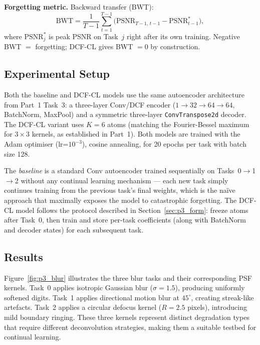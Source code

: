 \documentclass[11pt,letterpaper]{article}
\begin{document}
\textbf{Forgetting metric.}  Backward transfer (BWT):
\begin{equation}
  \mathrm{BWT} = \frac{1}{T{-}1}\sum_{t=1}^{T-1}
  \bigl(\mathrm{PSNR}_{T-1,\,t-1} - \mathrm{PSNR}^*_{t-1}\bigr),
\end{equation}
where $\mathrm{PSNR}^*_j$ is peak PSNR on Task~$j$ right after its own
training.  Negative BWT $=$ forgetting; DCF-CL gives BWT $= 0$ by construction.

\subsection{Experimental Setup}
\label{sec:p3_setup}

Both the baseline and DCF-CL models use the same autoencoder architecture
from Part~1 Task~3: a three-layer Conv/DCF encoder
($1\to32\to64\to64$, BatchNorm, MaxPool) and a symmetric three-layer
\texttt{ConvTranspose2d} decoder.  The DCF-CL variant uses $K=6$ atoms
(matching the Fourier-Bessel maximum for $3{\times}3$ kernels, as
established in Part~1).  Both models are trained with the Adam optimiser
(lr=$10^{-3}$), cosine annealing, for 20 epochs per task with batch size
128.

The \emph{baseline} is a standard Conv autoencoder trained sequentially
on Tasks~0$\to$1$\to$2 without any continual learning mechanism --- each
new task simply continues training from the previous task's final weights,
which is the na\"{i}ve approach that maximally exposes the model to
catastrophic forgetting.  The DCF-CL model follows the protocol described
in Section~\ref{sec:p3_form}: freeze atoms after Task~0, then train and
store per-task coefficients (along with BatchNorm and decoder states) for
each subsequent task.

\subsection{Results}
\label{sec:p3_results}

Figure~\ref{fig:p3_blur} illustrates the three blur tasks and their
corresponding PSF kernels.  Task~0 applies isotropic Gaussian blur
($\sigma=1.5$), producing uniformly softened digits.  Task~1 applies
directional motion blur at $45^\circ$, creating streak-like artefacts.
Task~2 applies a circular defocus kernel ($R=2.5$ pixels), introducing
mild boundary ringing.  These three kernels represent distinct degradation
types that require different deconvolution strategies, making them a
suitable testbed for continual learning.
\end{document}
